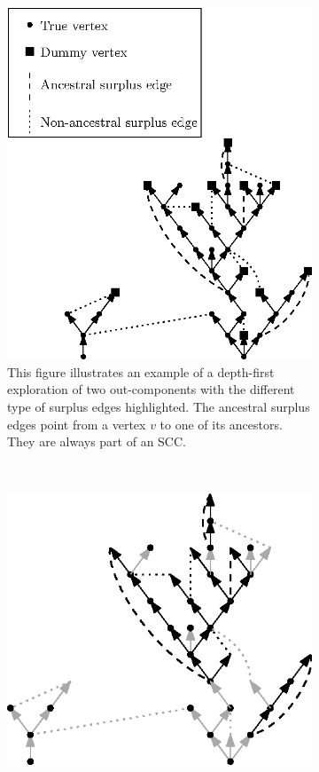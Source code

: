 \begin{figure}
\centering
\begin{subfigure}{0.8\textwidth}
 \centering
    \includegraphics[scale=1.2]{Content/Pictures/types_of_surplus_edges.eps}
    \caption{This figure illustrates an example of a depth-first exploration of two out-components with the different type of surplus edges highlighted. The ancestral surplus edges point from a vertex $v$ to one of its ancestors. They are always part of an SCC.}
    \label{subfigure.typesofsurplusedges} 
\end{subfigure}\\
\begin{subfigure}{0.8\textwidth}
  \centering
  \includegraphics[scale=1.2]{Content/Pictures/SCC_example.eps}

\end{subfigure}
\end{figure}
